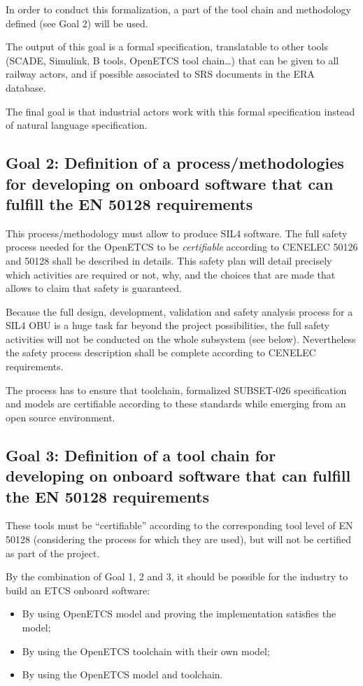\documentclass{template/openetcs_article}
\begin{document}
In order to conduct this formalization, a part of the tool chain and methodology defined (see Goal 2) 
will be used.

The output of this goal is a formal specification, translatable to other tools (SCADE, 
Simulink, B tools, OpenETCS tool chain\dots) that can be given to all railway actors, and 
if possible associated to SRS documents in the ERA database.

The final goal is that industrial actors work with this formal specification instead of 
natural language specification.

\subsection{Goal 2: Definition of a process/methodologies for developing 
on onboard software that can fulfill the EN 50128 requirements}

This process/methodology must allow to produce SIL4 software.
The full safety process needed for the OpenETCS to be \emph{certifiable} according to CENELEC 50126
and 50128 shall be described in details. This safety plan will detail precisely which activities 
are required or not, why, and the choices that are made that allows to claim that safety is guaranteed.

Because the full design, development, validation and safety analysis process for a SIL4 OBU
is a huge task far beyond the project possibilities, the full safety activities will not be conducted
on the whole subsystem (see below). Nevertheless the safety process description shall be complete 
according to CENELEC requirements.

The process has to ensure that toolchain, formalized SUBSET-026 specification and models are certifiable 
according to these standards while emerging from an open source environment. 

\subsection{Goal 3: Definition of a tool chain for developing 
on onboard software that can fulfill the EN 50128 requirements}

These tools must be ``certifiable'' according to the corresponding tool level of EN 50128 (considering the 
process for which they are used), but will not be certified as part of the project.

By the combination of Goal 1, 2 and 3, it should be possible for the industry to build an ETCS 
onboard software:
\begin{itemize}
\item By using OpenETCS model and proving the implementation satisfies the model;
\item By using the OpenETCS toolchain with their own model;
\item By using the OpenETCS model and toolchain.
\end{itemize}
\end{document}
